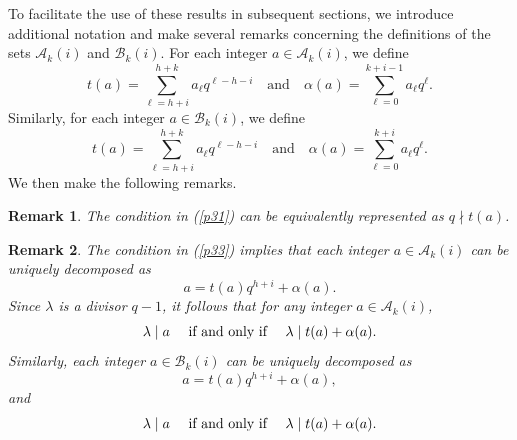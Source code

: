 \documentclass[journal,onecolumn]{IEEEtran}
\newtheorem{Remark}{Remark}
\begin{document}
To facilitate the use of these results in subsequent sections, we
introduce additional notation and make several remarks concerning the
definitions of the sets $\mathcal{A}_k(i)$ and $\mathcal{B}_k(i)$.
For each integer $a \in \mathcal{A}_k(i)$, we define
\begin{equation*}
t(a)=\sum_{\ell=h+i}^{h+k} a_{\ell} q^{\ell-h-i}
\quad \text{and} \quad
\alpha(a)=\sum_{\ell=0}^{k+i-1} a_{\ell} q^{\ell}.
\end{equation*}
Similarly, for each integer $a \in \mathcal{B}_k(i)$, we define
\begin{equation*}
t(a)=\sum_{\ell=h+i}^{h+k} a_{\ell} q^{\ell-h-i}
\quad \text{and} \quad
\alpha(a)=\sum_{\ell=0}^{k+i} a_{\ell} q^{\ell}.
\end{equation*}
We then make the following remarks.
\begin{Remark}\label{rm3}
 The condition in (\ref{p31})  can be equivalently represented as $q\nmid t(a)$.
\end{Remark}
\begin{Remark}\label{rr2}
 The condition  in (\ref{p33})  implies that each  integer $a\in \mathcal{A}_k(i)$ can be uniquely  decomposed as \begin{equation*}a=t(a)q^{h+i}+\alpha(a).
 \end{equation*}
 Since $\lambda$ is a divisor $q-1$, it follows that 
for any integer $a\in \mathcal{A}_k(i)$,  \begin{equation*} \lambda \mid a  \quad \hbox{ if and only if } \quad 
\lambda \mid t(a)+\alpha(a).\end{equation*}
Similarly, each integer $a\in \mathcal{B}_k(i)$ can be uniquely decomposed as 
\begin{equation*}
a=t(a)q^{h+i}+\alpha(a),\end{equation*} and 
 \begin{equation*}\lambda\mid a  \quad \hbox{ if and only if } \quad 
\lambda \mid t(a)+\alpha(a).\end{equation*} 
\end{Remark}   
\end{document}
